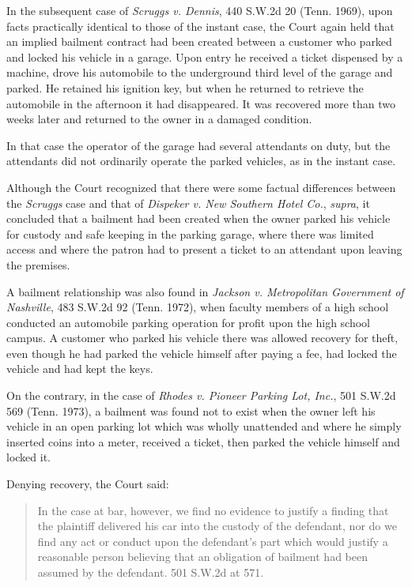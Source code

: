 In the subsequent case of \textit{Scruggs v. Dennis}, 440 S.W.2d 20 (Tenn.
1969), upon facts practically identical to those of the instant case, the Court
again held that an implied bailment contract had been created between a
customer who parked and locked his vehicle in a garage. Upon entry he received
a ticket dispensed by a machine, drove his automobile to the underground third
level of the garage and parked. He retained his ignition key, but when he
returned to retrieve the automobile in the afternoon it had disappeared. It was
recovered more than two weeks later and returned to the owner in a damaged
condition.

In that case the operator of the garage had several attendants on duty, but the
attendants did not ordinarily operate the parked vehicles, as in the instant
case.

Although the Court recognized that there were some factual differences between
the \textit{Scruggs} case and that of \textit{Dispeker v. New Southern Hotel
Co.}, \textit{supra}, it concluded that a bailment had been created when the
owner parked his vehicle for custody and safe keeping in the parking garage,
where there was limited access and where the patron had to present a ticket to
an attendant upon leaving the premises.

A bailment relationship was also found in \textit{Jackson v. Metropolitan
Government of Nashville}, 483 S.W.2d 92 (Tenn. 1972), when faculty members of a
high school conducted an automobile parking operation for profit upon the high
school campus. A customer who parked his vehicle there was allowed recovery for
theft, even though he had parked the vehicle himself after paying a fee, had
locked the vehicle and had kept the keys.

On the contrary, in the case of \textit{Rhodes v. Pioneer Parking Lot, Inc.},
501 S.W.2d 569 (Tenn. 1973), a bailment was found not to exist when the owner
left his vehicle in an open parking lot which was wholly unattended and where
he simply inserted coins into a meter, received a ticket, then parked the
vehicle himself and locked it.

Denying recovery, the Court said:
\begin{quote}
In the case at bar, however, we find no evidence to justify a finding that the
plaintiff delivered his car into the custody of the defendant, nor do we find
any act or conduct upon the defendant's part which would justify a reasonable
person believing that an obligation of bailment had been assumed by the
defendant. 501 S.W.2d at 571.
\end{quote}

